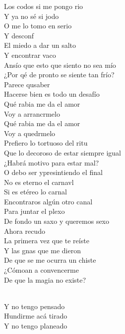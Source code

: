 \begin{cancion}[Arrancármelo][Wos]
	Los codos si me pongo rio\\
Y ya no sé si jodo\\
O me lo tomo en serio\\
\jump
	Y desconf\\
El miedo a dar un salto\\
	Y encontrar vaco\\
Ansío que esto que siento no sea mío\\
	¿Por qé de pronto se siente tan frío?\\
	Parece qusaber\\
Hacerse bien es todo un desafío\\
\jump
	 Qué rabia me da el amor\\
	Voy a arrancrmelo\\
Qué rabia me da el amor\\
	Voy a quedrmelo \\
	Prefiero lo tortuoso del ritu\\
Que lo decoroso de estar siempre igual\\
\jump
	 ¿Habrá motivo para estar mal?\\
	O debo ser ypresintiendo el final\\
	No es eterno el carnavl\\
Si es etéreo lo carnal\\
	Encontraros algún otro canal\\
Para juntar el plexo\\
\jump
	 De fondo un saxo y queremos sexo\\
	Ahora recudo\\
La primera vez que te reíste\\
	Y las gnas que me dieron\\
De que se me ocurra un chiste\\
	¿Cómoan a convencerme\\
De que la magia no existe?\\\jump\\
	\begin{chorus}%
	 Y no tengo pensado\\
	 Hundirme acá tirado\\
	 Y no tengo planeado\\

\end{chorus}
\end{cancion}
